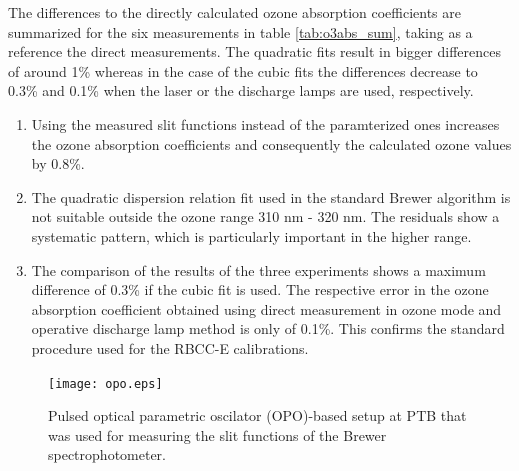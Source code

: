 \documentclass[acp]{copernicus} %
\begin{document}
The differences to the directly calculated ozone absorption coefficients are summarized for the six measurements in table \ref{tab:o3abs_sum}, taking as a reference the direct measurements. The quadratic fits result in bigger differences of around 1\% whereas in the case of the cubic fits the differences decrease to 0.3\% and  0.1\%  when the laser or the discharge lamps are used, respectively.   




\conclusions{}

\begin{enumerate}


    \item Using the measured slit functions instead of the paramterized ones increases the ozone absorption coefficients and consequently the calculated ozone values by 0.8\%.

    \item The quadratic dispersion relation fit used in the standard Brewer algorithm is not suitable outside the ozone range 310 nm - 320 nm. The residuals show a systematic pattern, which is particularly important in the higher range.%

    \item The comparison of the results of the three experiments shows a maximum difference of 0.3\% if the cubic fit is used. The respective error in the ozone absorption coefficient obtained using direct measurement in ozone mode and operative discharge lamp method is only of 0.1\%. This confirms the standard procedure used for the RBCC-E calibrations.

\end{enumerate}




\clearpage
\begin{figure}[t]
\texttt{[image: opo.eps]}
\caption{Pulsed optical parametric oscilator (OPO)-based setup at PTB that was used for measuring the slit functions of the Brewer spectrophotometer.}
\label{fig:opo}
\end{figure}
\end{document}
